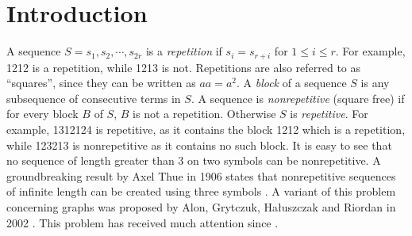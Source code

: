 \documentclass{patmorin}
\begin{document}
\section{Introduction}
A sequence $S=s_1,s_2,\cdots,s_{2r}$ is a \emph{repetition} if $s_i=s_{r+i}$ for $1 \leq i \leq r$. For example, 1212 is a repetition, while 1213 is not. Repetitions are also referred to as ``squares'', since they can be written as $aa=a^2$. A \emph{block} of a sequence $S$ is any subsequence of consecutive terms in $S$. A sequence is \emph{nonrepetitive} (square free) if for every block $B$ of $S$, $B$ is not a repetition. Otherwise $S$ is \emph{repetitive}. For example, 1312124 is repetitive, as it contains the block 1212 which is a repetition, while 123213 is nonrepetitive as it contains no such block.  It is easy to see that no sequence of length greater than 3 on two symbols can be nonrepetitive. A groundbreaking result by Axel Thue in 1906 states that nonrepetitive sequences of infinite length can be created using three symbols \cite{thue1906uber}. A variant of this problem concerning graphs was proposed by Alon, Grytczuk, Ha{\l}uszczak and Riordan in 2002 \cite{alon2002nonrepetitive}. This problem has received much attention since \cite{barat2013facial, barat2007square, barat2008note, brevsar2007nonrepetitive, currie2002cycle18, dujmovic2012planarlogn, dujmovic2011nonrepetitive, fiorenzi2011thue, gonccalves2014entropy, grytczuk2007nonrepetitivesurvey, grytczuk2007nonrepetitive, grytczuk2013new, harant2012nonrepetitive, kozik2013nonrepetitive, kundgen2008nonrepetitive, pezarski2009non, schreyer2012facial, schreyer2013total}. 
\end{document}
